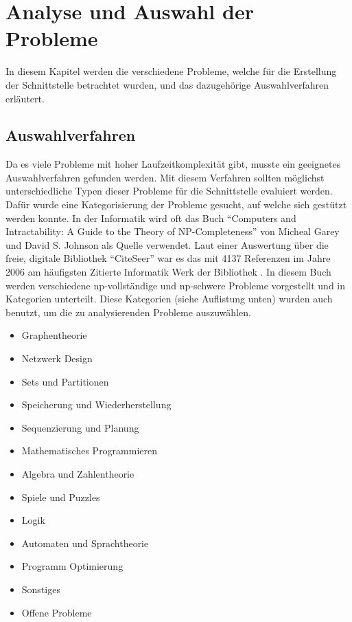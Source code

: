 %
%

\chapter{Analyse und Auswahl der Probleme \resultAssignment{[R1]}}\label{chap.problemauswahl}
In diesem Kapitel werden die verschiedene Probleme, welche für die Erstellung der Schnittstelle betrachtet wurden, und das dazugehörige Auswahlverfahren erläutert.

\section{Auswahlverfahren}\label{cat_theo_inf}
Da es viele Probleme mit hoher Laufzeitkomplexität gibt, musste ein geeignetes Auswahlverfahren gefunden werden. Mit diesem Verfahren sollten möglichst unterschiedliche 
Typen dieser Probleme für die Schnittstelle evaluiert werden. Dafür wurde eine Kategorisierung der Probleme gesucht, auf welche sich gestützt werden konnte. In der Informatik wird oft 
das Buch "`Computers and Intractability: A Guide to the Theory of NP-Completeness"' \cite{garey1979computers} von Micheal Garey und David S. Johnson als Quelle verwendet. Laut einer 
Auswertung über die freie, digitale Bibliothek "`CiteSeer"' war es das mit 4137 Referenzen im Jahre 2006 am häufigsten Zitierte Informatik Werk der Bibliothek \cite{citeseer_algo_buch}. In 
diesem Buch werden verschiedene \gls{np}-vollständige und \gls{np}-schwere Probleme vorgestellt und in Kategorien unterteilt. Diese Kategorien (siehe Auflistung unten) wurden auch benutzt, 
um die zu analysierenden Probleme auszuwählen.

\begin{itemize}
	\item Graphentheorie
	\item Netzwerk Design
	\item Sets und Partitionen
	\item Speicherung und Wiederherstellung
	\item Sequenzierung und Planung
	\item Mathematisches Programmieren
	\item Algebra und Zahlentheorie
	\item Spiele und Puzzles
	\item Logik
	\item Automaten und Sprachtheorie
	\item Programm Optimierung
	\item Sonstiges
	\item Offene Probleme
\end{itemize}

